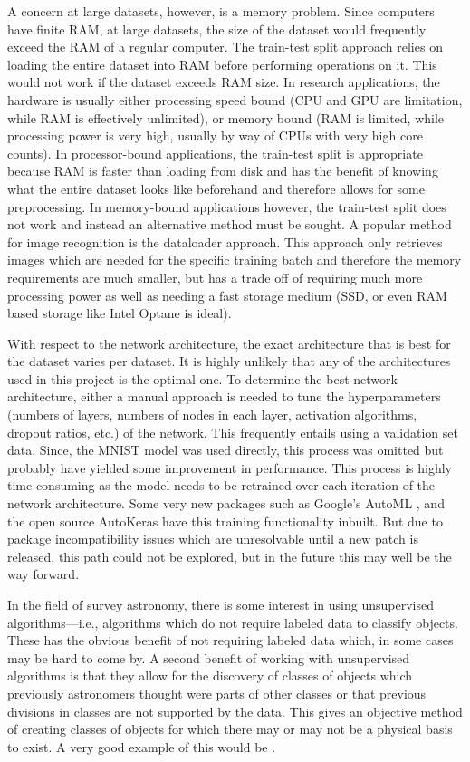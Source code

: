 \documentclass[a4paper,fleqn,usenatbib]{mnras}
\begin{document}
A concern at large datasets, however, is a memory problem. Since computers have finite RAM, at large datasets, the size of the dataset would frequently exceed the RAM of a regular computer. The train-test split approach relies on loading the entire dataset into RAM before performing operations on it. This would not work if the dataset exceeds RAM size. In research applications, the hardware is usually either processing speed bound (CPU and GPU are limitation, while RAM is effectively unlimited), or memory bound (RAM is limited, while processing power is very high, usually by way of CPUs with very high core counts). In processor-bound applications, the train-test split is appropriate because RAM is faster than loading from disk and has the benefit of knowing what the entire dataset looks like beforehand and therefore allows for some preprocessing. In memory-bound applications however, the train-test split does not work and instead an alternative method must be sought. A popular method for image recognition is the dataloader approach. \citep{Dataloader} This approach only retrieves images which are needed for the specific training batch and therefore the memory requirements are much smaller, but has a trade off of requiring much more processing power as well as needing a fast storage medium (SSD, or even RAM based storage like Intel Optane is ideal). 

With respect to the network architecture, the exact architecture that is best for the dataset varies per dataset. It is highly unlikely that any of the architectures used in this project is the optimal one. To determine the best network architecture, either a manual approach is needed to tune the hyperparameters (numbers of layers, numbers of nodes in each layer, activation algorithms, dropout ratios, etc.) of the network. This frequently entails using a validation set data. Since, the MNIST model was used directly, this process was omitted but probably have yielded some improvement in performance. This process is highly time consuming as the model needs to be retrained over each iteration of the network architecture. Some very new packages such as Google's AutoML \citep{AutoML}, and the open source AutoKeras \citep{AutoKeras} have this training functionality inbuilt. But due to package incompatibility issues which are unresolvable until a new patch is released, this path could not be explored, but in the future this may well be the way forward. 

In the field of survey astronomy, there is some interest in using unsupervised algorithms---i.e., algorithms which do not require labeled data to classify objects. These has the obvious benefit of not requiring labeled data which, in some cases may be hard to come by. A second benefit of working with unsupervised algorithms is that they allow for the discovery of classes of objects which previously astronomers thought were parts of other classes or that previous divisions in classes are not supported by the data. This gives an objective method of creating classes of objects for which there may or may not be a physical basis to exist. A very good example of this would be \citet{Hocking2018}.
\end{document}
